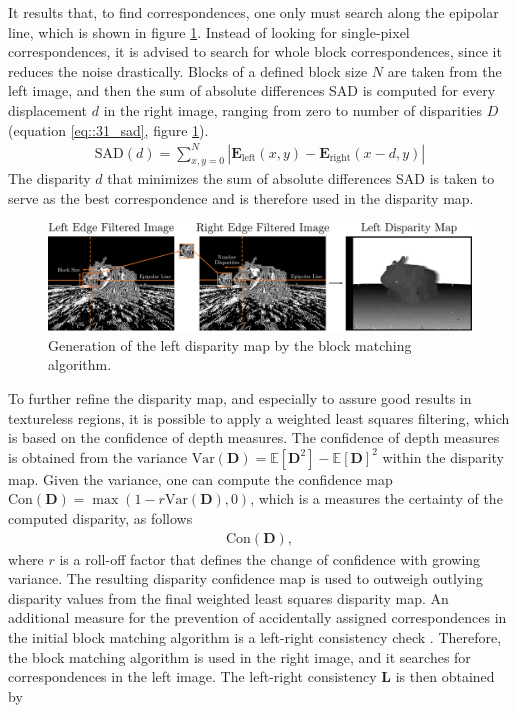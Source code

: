 It results that, to find correspondences, one only must search along the epipolar line, which is shown in figure \ref{fig::31_left_disparity_map}. Instead of looking for single-pixel correspondences, it is advised to search for whole block correspondences, since it reduces the noise drastically. Blocks of a defined block size $N$ are taken from the left image, and then the sum of absolute differences SAD is computed for every displacement $d$ in the right image, ranging from zero to number of disparities $D$ (equation \ref{eq::31_sad}, figure \ref{fig::31_left_disparity_map}).
\begin{align}
	\text{SAD}(d) = \sum_{x,y=0}^N |\bm{E}_\text{left}(x,y) - \bm{E}_\text{right}(x-d,y)|
	\label{eq::31_sad}
\end{align}
The disparity $d$ that minimizes the sum of absolute differences SAD is taken to serve as the best correspondence and is therefore used in the disparity map.
\begin{figure}[h!]
	\centering
	\includegraphics[scale=.28]{chapters/03_fundamentals_of_image_processing/img/left_disparity_map.png}
	\caption{Generation of the left disparity map by the block matching algorithm.}
	\label{fig::31_left_disparity_map}
\end{figure}
To further refine the disparity map, and especially to assure good results in textureless  regions, it is possible to apply a weighted least squares filtering, which is based on the confidence of depth measures. The confidence of depth measures is obtained from the variance $\text{Var}(\bm{D}) = \mathbb{E}\left[\bm{D}^2\right] - \mathbb{E}\left[\bm{D}\right]^2$ within the disparity map. Given the variance, one can compute the confidence map $\text{Con}(\bm{D})= \max\left(1-r\text{Var}(\bm{D}),0\right)$, which is a measures the certainty of the computed disparity, as follows
\begin{align}
	\text{Con}(\bm{D}) ,
\end{align}
where $r$ is a roll-off factor that defines the change of confidence with growing variance. The resulting disparity confidence map is used to outweigh outlying disparity values from the final weighted least squares disparity map. An additional measure for the prevention of accidentally assigned correspondences in the initial block matching algorithm is a left-right consistency check \cite{egnal2004stereo}. Therefore, the block matching algorithm is used in the right image, and it searches for correspondences in the left image. The left-right consistency $\bm{L}$ is then obtained by 
